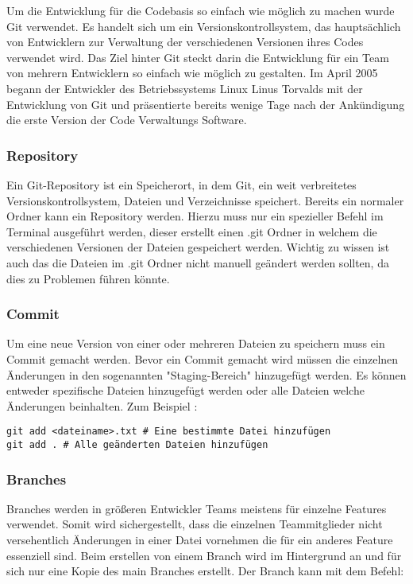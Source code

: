 Um die Entwicklung für die Codebasis so einfach wie möglich zu machen wurde Git verwendet. Es handelt sich um ein Versionskontrollsystem, das hauptsächlich von Entwicklern zur Verwaltung der verschiedenen Versionen ihres Codes verwendet wird. Das Ziel hinter Git steckt darin die Entwicklung für ein Team von mehrern Entwicklern so einfach wie möglich zu gestalten. Im April 2005 begann der Entwickler des Betriebssystems Linux Linus Torvalds mit der Entwicklung von Git und präsentierte bereits wenige Tage nach der Ankündigung die erste Version der Code Verwaltungs Software.

\subsubsection{Repository}

Ein Git-Repository ist ein Speicherort, in dem Git, ein weit verbreitetes Versionskontrollsystem, Dateien und Verzeichnisse speichert. Bereits ein normaler Ordner kann ein Repository werden. Hierzu muss nur ein spezieller Befehl im Terminal ausgeführt werden, dieser erstellt einen .git Ordner in welchem die verschiedenen Versionen der Dateien gespeichert werden. Wichtig zu wissen ist auch das die Dateien im .git Ordner nicht manuell geändert werden sollten, da dies zu Problemen führen könnte.

\subsubsection{Commit}

Um eine neue Version von einer oder mehreren Dateien zu speichern muss ein Commit gemacht werden. Bevor ein Commit gemacht wird müssen die einzelnen Änderungen in den sogenannten "Staging-Bereich" hinzugefügt werden. Es können entweder spezifische Dateien hinzugefügt werden oder alle Dateien welche Änderungen beinhalten. Zum Beispiel :

\begin{verbatim}
git add <dateiname>.txt # Eine bestimmte Datei hinzufügen
git add . # Alle geänderten Dateien hinzufügen
\end{verbatim}

\subsubsection{Branches}

Branches werden in größeren Entwickler Teams meistens für einzelne Features verwendet. Somit wird sichergestellt, dass die einzelnen Teammitglieder nicht versehentlich Änderungen in einer Datei vornehmen die für ein anderes Feature essenziell sind. Beim erstellen von einem Branch wird im Hintergrund an und für sich nur eine Kopie des main Branches erstellt. Der Branch kann mit dem Befehl: 


